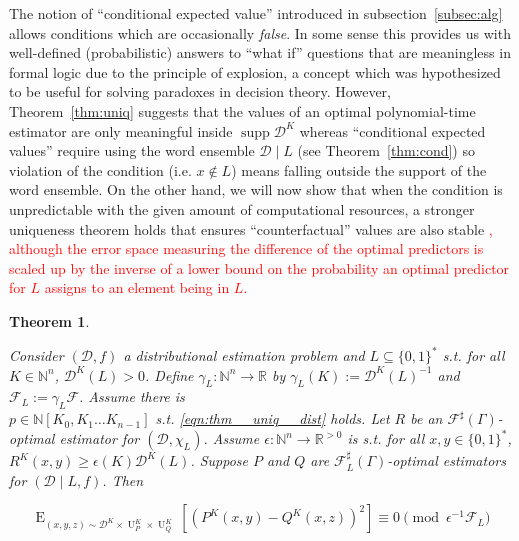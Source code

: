 \documentclass[11pt]{article}
\numberwithin{equation}{section}
\theoremstyle{definition}
\theoremstyle{plain}
\newtheorem{theorem}{Theorem}[section]
\newcommand{\Bool}{\{0,1\}}
\newcommand{\Words}{{\Bool^*}}
\DeclareMathOperator{\Supp}{supp}
\DeclareMathOperator{\E}{E}
\DeclareMathOperator{\Un}{U}
\newcommand{\Nats}{\mathbb{N}}
\newcommand{\Reals}{\mathbb{R}}
\newcommand{\NatPoly}{\Nats[K_0, K_1 \ldots K_{n-1}]}
\newcommand{\NatFun}{\Nats^n \rightarrow}
\newcommand{\Dist}{\mathcal{D}}
\newcommand{\Fall}{\mathcal{F}}
\newcommand{\ESG}{\Fall^\sharp(\Gamma)}
\begin{document}
The notion of \enquote{conditional expected value} introduced in subsection~\ref{subsec:alg} allows conditions which are occasionally \emph{false}. In some sense this provides us with well-defined (probabilistic) answers to \enquote{what if} questions that are meaningless in formal logic due to the principle of explosion, a concept which was hypothesized to be useful for solving paradoxes in decision theory\cite{Soares_2015}. However, Theorem~\ref{thm:uniq} suggests that the values of an optimal polynomial-time estimator are only meaningful inside ${\Supp \Dist^K}$ whereas \enquote{conditional expected values} require using the word ensemble ${\Dist \mid L}$ (see Theorem~\ref{thm:cond}) so violation of the condition (i.e. ${x \not\in L}$) means falling outside the support of the word ensemble. On the other hand, we will now show that when the condition is unpredictable with the given amount of computational resources, a stronger uniqueness theorem holds that ensures \enquote{counterfactual} values are also stable \textcolor{red}{, although the error space measuring the difference of the optimal predictors is scaled up by the inverse of a lower bound on the probability an optimal predictor for $L$ assigns to an element being in $L$.}

\begin{samepage}
\begin{theorem}
\label{thm:uniq_cond}

Consider ${(\Dist,f)}$ a distributional estimation problem and ${L \subseteq \Words}$ s.t. for all ${K \in \Nats^n}$, $\Dist^K(L) > 0$. Define $\gamma_L: \NatFun \Reals$ by $\gamma_L(K):=\Dist^{K}(L)^{-1}$ and $\Fall_L:=\gamma_L \Fall$. Assume there is\\ ${p \in \NatPoly}$ s.t. \ref{eqn:thm__uniq__dist} holds. Let ${R}$ be an ${\ESG}$-optimal estimator for ${(\Dist, \chi_L)}$. Assume ${\epsilon: \NatFun \Reals^{>0}}$ is s.t. for all ${x,y \in \Words}$, ${R^K(x,y) \geq \epsilon(K) \Dist^K(L)}$. Suppose ${P}$ and ${Q}$ are ${\Fall_L^\sharp(\Gamma)}$-optimal estimators for ${(\Dist \mid L,f)}$. Then

\begin{equation}
\E_{(x,y,z) \sim \Dist^K \times \Un_P^K \times \Un_Q^K}[(P^K(x,y)-Q^K(x,z))^2] \equiv 0 \pmod {\epsilon^{-1} \Fall_L}
\end{equation}

\end{theorem}
\end{samepage}
\end{document}
